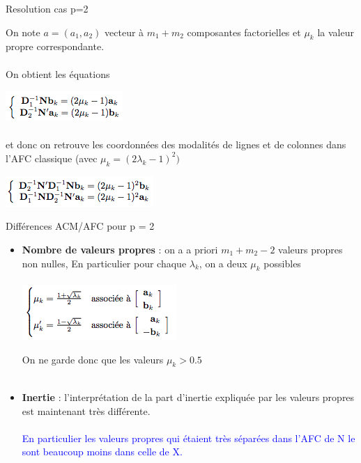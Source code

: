 \documentclass[10pt]{beamer}
\begin{document}
\begin{frame}{Resolution cas p=2}
 
\centering 

 On note $a = (a_{1},  a_{2})$ vecteur à $m_1 +  m_2$ composantes   factorielles et $\mu_k$ la valeur propre correspondante.\\ \ \\
 
 
  
  On obtient les équations
  
   \includegraphics[scale=0.7]{AFC2} \\ \ \\
  
 et donc on retrouve les coordonnées des modalités de lignes
et de colonnes dans l'AFC classique (avec 
$\mu_k =(2\lambda_k - 1)^2) $

 \includegraphics[scale=0.7]{AFC3} 
 
\end{frame}






\begin{frame}{Différences ACM/AFC pour p = 2}
 
\begin{itemize}
 \item \textbf{ Nombre de valeurs propres} : on a a priori $m_1 + m_2 - 2$ valeurs propres non nulles, En particulier pour chaque $\lambda_k$, on a deux $\mu_k$ possibles\\~\\
 
 \includegraphics[scale=0.6]{AFC4} 
 
 On ne garde donc que les valeurs $\mu_k >0.5$\\~\\
 
 \item \textbf{Inertie} : l'interprétation de la part d'inertie expliquée par
les valeurs propres est maintenant très différente. \\~\\
\textcolor{blue}{En particulier les valeurs propres qui étaient très séparées dans
l’AFC de N le sont beaucoup moins dans celle de X.}
 
 \end{itemize} 
 
\end{frame}
\end{document}
